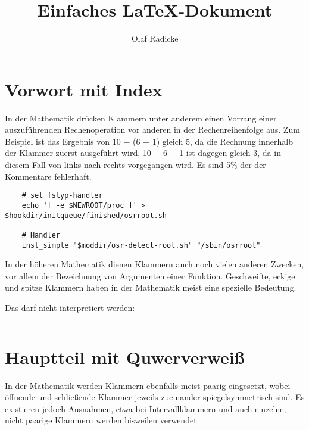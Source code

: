 \documentclass[10pt,a4paper]{article}
\author{Olaf Radicke}
\title{Einfaches LaTeX-Dokument}
\begin{document}


\maketitle

\newpage

\tableofcontents

\newpage

\section {Vorwort mit Index}

In der Mathematik drücken Klammern unter anderem einen Vorrang einer
auszuführenden Rechenoperation vor anderen in der Rechenreihenfolge aus. Zum
Beispiel ist das Ergebnis von 10 − (6 − 1) gleich 5, da
die Rechnung innerhalb %
der Klammer zuerst ausgeführt wird, 10 − 6 − 1 ist dagegen gleich 3, da in
diesem Fall von links nach rechts vorgegangen wird.
Es sind 5\% der der Kommentare fehlerhaft.

\begin{lstlisting}
    # set fstyp-handler
    echo '[ -e $NEWROOT/proc ]' > $hookdir/initqueue/finished/osrroot.sh

    # Handler
    inst_simple "$moddir/osr-detect-root.sh" "/sbin/osrroot"
\end{lstlisting}


In der höheren Mathematik
dienen Klammern auch noch vielen anderen Zwecken, vor allem der Bezeichnung
von Argumenten einer Funktion. Geschweifte, eckige und spitze Klammern haben
in der Mathematik meist eine spezielle Bedeutung.

Das darf nicht interpretiert werden:
\begin{verbatim}

\end{verbatim} 



%

\section{Hauptteil mit Quwerverweiß}

In der Mathematik werden Klammern ebenfalls meist paarig eingesetzt, wobei
öffnende und schließende Klammer jeweils zueinander spiegelsymmetrisch sind.
Es existieren jedoch Ausnahmen, etwa bei Intervallklammern und auch einzelne,
nicht paarige Klammern werden bisweilen verwendet.
\end{document}

